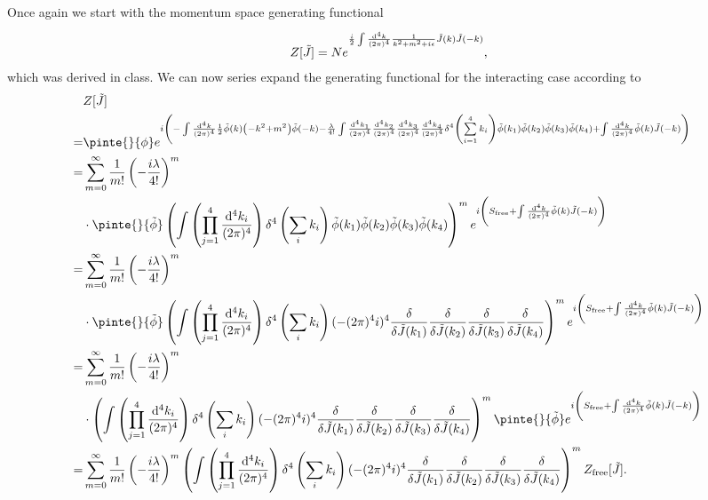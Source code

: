 Once again we start with the momentum space generating functional
\begin{align*}
Z[\tilde{J}] = Ne^{\frac{i}{2}\int\limits_{}^{}\frac{\dd[4]{k}}{(2\pi)^{4}}\frac{1}{k^{2} + m^{2} + i\epsilon}\tilde{J}(k)\tilde{J}(-k)},
\end{align*}
which was derived in class. We can now series expand the generating functional for the interacting case according to
\begin{align*}
&Z[\tilde{J}] \\
=& \pinte{}{\phi}e^{i\left(-\inte{}{}\frac{\dd[4]{k}}{(2\pi)^{4}}\frac{1}{2}\tilde{\phi}(k)\left(-k^{2} + m^{2}\right)\tilde{\phi}(-k) - \frac{\lambda}{4!}\inte{}{}\frac{\dd[4]{k}_{1}}{(2\pi)^{4}}\frac{\dd[4]{k}_{2}}{(2\pi)^{4}}\frac{\dd[4]{k}_{3}}{(2\pi)^{4}}\frac{\dd[4]{k}_{4}}{(2\pi)^{4}}\delta^{4}\left(\sum\limits_{i = 1}^{4}k_{i}\right)\tilde{\phi}(k_{1})\tilde{\phi}(k_{2})\tilde{\phi}(k_{3})\tilde{\phi}(k_{4}) + \inte{}{}\frac{\dd[4]{k}}{(2\pi)^{4}}\tilde{\phi}(k)\tilde{J}(-k)\right)} \\
=& \sum\limits_{m = 0}^{\infty}\frac{1}{m!}\left(-\frac{i\lambda}{4!}\right)^{m} \\
&\cdot\pinte{}{\tilde{\phi}}\left(\inte{}{}\left(\prod\limits_{j = 1}^{4}\frac{\dd[4]{k_{i}}}{(2\pi)^{4}}\right)\delta^{4}\left(\sum\limits_{i}k_{i}\right)\tilde{\phi}(k_{1})\tilde{\phi}(k_{2})\tilde{\phi}(k_{3})\tilde{\phi}(k_{4})\right)^{m}e^{i\left(S_{\text{free}} + \inte{}{}\frac{\dd[4]{k}}{(2\pi)^{4}}\tilde{\phi}(k)\tilde{J}(-k)\right)} \\
=& \sum\limits_{m = 0}^{\infty}\frac{1}{m!}\left(-\frac{i\lambda}{4!}\right)^{m} \\
&\cdot\pinte{}{\tilde{\phi}}\left(\inte{}{}\left(\prod\limits_{j = 1}^{4}\frac{\dd[4]{k_{i}}}{(2\pi)^{4}}\right)\delta^{4}\left(\sum\limits_{i}k_{i}\right)(-(2\pi)^{4}i)^{4}\fdv{\tilde{J}(k_{1})}\fdv{\tilde{J}(k_{2})}\fdv{\tilde{J}(k_{3})}\fdv{\tilde{J}(k_{4})}\right)^{m}e^{i\left(S_{\text{free}} + \inte{}{}\frac{\dd[4]{k}}{(2\pi)^{4}}\tilde{\phi}(k)\tilde{J}(-k)\right)} \\
=& \sum\limits_{m = 0}^{\infty}\frac{1}{m!}\left(-\frac{i\lambda}{4!}\right)^{m} \\
&\cdot\left(\inte{}{}\left(\prod\limits_{j = 1}^{4}\frac{\dd[4]{k_{i}}}{(2\pi)^{4}}\right)\delta^{4}\left(\sum\limits_{i}k_{i}\right)(-(2\pi)^{4}i)^{4}\fdv{\tilde{J}(k_{1})}\fdv{\tilde{J}(k_{2})}\fdv{\tilde{J}(k_{3})}\fdv{\tilde{J}(k_{4})}\right)^{m}\pinte{}{\tilde{\phi}}e^{i\left(S_{\text{free}} + \inte{}{}\frac{\dd[4]{k}}{(2\pi)^{4}}\tilde{\phi}(k)\tilde{J}(-k)\right)} \\
=& \sum\limits_{m = 0}^{\infty}\frac{1}{m!}\left(-\frac{i\lambda}{4!}\right)^{m}\left(\inte{}{}\left(\prod\limits_{j = 1}^{4}\frac{\dd[4]{k_{i}}}{(2\pi)^{4}}\right)\delta^{4}\left(\sum\limits_{i}k_{i}\right)(-(2\pi)^{4}i)^{4}\fdv{\tilde{J}(k_{1})}\fdv{\tilde{J}(k_{2})}\fdv{\tilde{J}(k_{3})}\fdv{\tilde{J}(k_{4})}\right)^{m}Z_{\text{free}}[\tilde{J}].
\end{align*}

